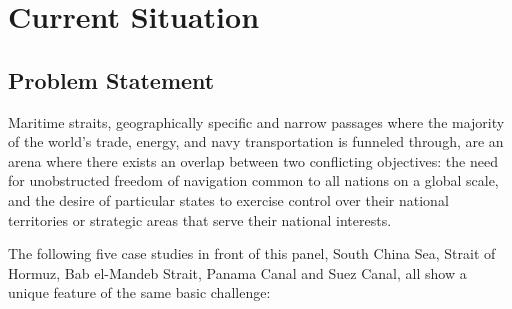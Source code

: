 \section{Current Situation}

\subsection{Problem Statement}

Maritime straits, geographically specific and narrow passages where the majority of the world’s trade, energy, and navy transportation is funneled through, are an arena where there exists an overlap between two conflicting objectives: the need for unobstructed freedom of navigation common to all nations on a global scale, and the desire of particular states to exercise control over their national territories or strategic areas that serve their national interests.

The following five case studies in front of this panel, South China Sea, Strait of Hormuz, Bab el-Mandeb Strait, Panama Canal and Suez Canal, all show a unique feature of the same basic challenge:

